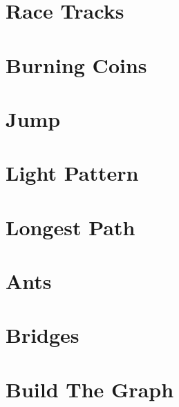\documentclass[a4paper, 10pt]{article}
\let\stdsection\section
\renewcommand\section{\newpage\stdsection}
\newcommand{\includecode}[1]{
    }
\begin{document}
    \section{Race Tracks}
        \includecode{../problems/w02/Race_Tracks/RaceTracks1.cpp}

    
    \section{Burning Coins}
        \includecode{../problems/w03/Burning_Coins/BurningCoin1.cpp}
        
    \section{Jump}
        \includecode{../problems/w03/Jump/Jump1.cpp}
        
    \section{Light Pattern}
        \includecode{../problems/w03/Light_Pattern/LightPatterns1.cpp}
        
    \section{Longest Path}
        \includecode{../problems/w03/Longest_Path/LongestPath1.cpp}
        \includecode{../problems/w03/Longest_Path/LongestPathTraversal1.cpp}
             
              
    \section{Ants}
        \includecode{../problems/w04/Ants/Ants1.cpp}
        
    \section{Bridges}
        \includecode{../problems/w04/Bridges/Bridges1_BGL.cpp}
        \includecode{../problems/w04/Bridges/Bridges1_Handmade.cpp}
        
    \section{Build The Graph}
        \includecode{../problems/w04/Build_The_Graph/BuildTheGraph1.cpp}
        
\end{document}
